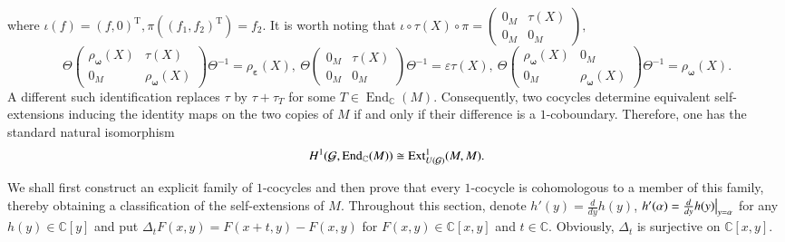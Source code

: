 \documentclass[12pt,reqno]{amsart}
\def\C{\mathbb{C}}
\numberwithin{equation}{section}
\begin{document}
where $\iota(f)=(f,0)^{\operatorname{T}},\pi\left((f_1,f_2)^{\operatorname{T}}\right)=f_2$. It is worth noting that
$\iota\circ\tau(X)\circ\pi=\begin{pmatrix}
    0_M & \tau(X)\\
    0_M & 0_M
\end{pmatrix},$
$$\Theta\begin{pmatrix}
    \rho_{\boldsymbol{\omega}}(X) & \tau(X) \\
    0_M & \rho_{\boldsymbol{\omega}}(X)
\end{pmatrix}\Theta^{-1}=\rho_{\boldsymbol{\varepsilon}}(X), \ \Theta\begin{pmatrix}
    0_M & \tau(X) \\
    0_M & 0_M
\end{pmatrix}\Theta^{-1}=\varepsilon\tau(X),\ 
\Theta\begin{pmatrix}
    \rho_{\boldsymbol{\omega}}(X) & 0_M \\
    0_M & \rho_{\boldsymbol{\omega}}(X)
\end{pmatrix}\Theta^{-1}=\rho_{\boldsymbol{\omega}}(X).$$
A different such identification replaces  $\tau$ by
$\tau+\tau_T$ for some $T\in\operatorname{End}_{\mathbb C}(M)$.
Consequently, two cocycles determine equivalent self-extensions
inducing the identity maps on the two copies of $M$ if and only if
their difference is a $1$-coboundary. Therefore, one has the standard
natural isomorphism
\begin{equation}\label{formula 4.5}
\aligned
H^1(\mathcal{G},\operatorname{End}_{\mathbb C}(M))\cong \operatorname{Ext}^1_{U(\mathcal{G})}(M,M).
\endaligned
\end{equation}

We shall first construct an explicit family of $1$-cocycles and then prove that every $1$-cocycle is cohomologous to a member of this family, thereby obtaining a classification of the self-extensions of $M$.
Throughout
this section, denote $h'(y)=\frac{d}{d{y}}h(y)$, $h'(\alpha)=\frac{d}{d{y}}h(y)\big{|}_{y=\alpha}$ for any $h(y)\in \C[y]$ and put $\Delta_tF(x,y)=F(x+t,y)-F(x,y)$
for $F(x,y)\in\mathbb C[x,y]$ and $t\in\mathbb C$. Obviously, $\Delta_t$ is surjective on $\C[x,y]$.
\end{document}
